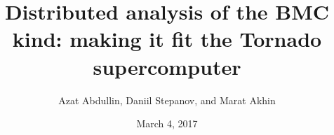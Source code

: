 
\title{Distributed analysis of the BMC kind: making it fit the Tornado supercomputer}
\author{Azat Abdullin, Daniil Stepanov, and Marat Akhin}
\date{March 4, 2017}



\begin{frame}
\titlepage
\end{frame} 

%  
